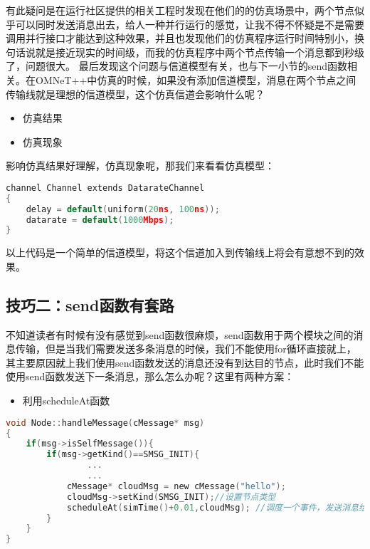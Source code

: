 有此疑问是在运行社区提供的相关工程时发现在他们的的仿真场景中，两个节点似乎可以同时发送消息出去，给人一种并行运行的感觉，让我不得不怀疑是不是需要调用并行接口才能达到这种效果，并且也发现他们的仿真程序运行时间特别小，换句话说就是接近现实的时间级，而我的仿真程序中两个节点传输一个消息都到秒级了，问题很大。
最后发现这个问题与信道模型有关，也与下一小节的send函数相关。在OMNeT++中仿真的时候，如果没有添加信道模型，消息在两个节点之间传输线就是理想的信道模型，这个仿真信道会影响什么呢？

\begin{itemize}
\item 仿真结果

\item 仿真现象

\end{itemize}

影响仿真结果好理解，仿真现象呢，那我们来看看仿真模型：

\begin{lstlisting}[language=c]
channel Channel extends DatarateChannel
{
    delay = default(uniform(20ns, 100ns));
    datarate = default(1000Mbps);
}
\end{lstlisting}

以上代码是一个简单的信道模型，将这个信道加入到传输线上将会有意想不到的效果。

\subsection{技巧二：send函数有套路}
\label{技巧二：send函数有套路}

不知道读者有时候有没有感觉到send函数很麻烦，send函数用于两个模块之间的消息传输，但是当我们需要发送多条消息的时候，我们不能使用for循环直接就上，其主要原因就上我们使用send函数发送的消息还没有到达目的节点，此时我们不能使用send函数发送下一条消息，那么怎么办呢？这里有两种方案：

\begin{itemize}
\item 利用scheduleAt函数

\end{itemize}

\begin{lstlisting}[language=c]
void Node::handleMessage(cMessage* msg)
{
    if(msg->isSelfMessage()){
        if(msg->getKind()==SMSG_INIT){
                ...
                ...
            cMessage* cloudMsg = new cMessage("hello");
            cloudMsg->setKind(SMSG_INIT);//设置节点类型
            scheduleAt(simTime()+0.01,cloudMsg); //调度一个事件，发送消息给自己
        }
    }
}
\end{lstlisting}

